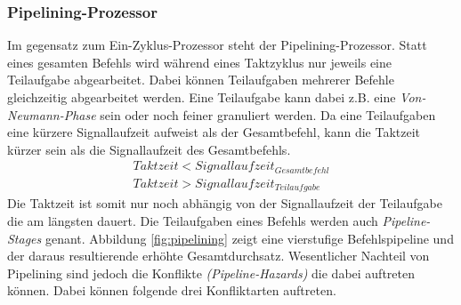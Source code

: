             \subsubsection{Pipelining-Prozessor}
                Im gegensatz zum Ein-Zyklus-Prozessor steht der Pipelining-Prozessor.
                Statt eines gesamten Befehls wird während eines Taktzyklus nur jeweils eine Teilaufgabe abgearbeitet.
                Dabei können Teilaufgaben mehrerer Befehle gleichzeitig abgearbeitet werden.
                Eine Teilaufgabe kann dabei z.B. eine \textit{Von-Neumann-Phase} sein oder noch feiner granuliert werden.
                Da eine Teilaufgaben eine kürzere Signallaufzeit aufweist als der Gesamtbefehl,
                kann die Taktzeit kürzer sein als die Signallaufzeit des Gesamtbefehls.
                \begin{equation}
                    \begin{split}
                        Taktzeit < Signallaufzeit_{Gesamtbefehl} \\
                        Taktzeit > Signallaufzeit_{Teilaufgabe}
                    \end{split}
                \end{equation}
                Die Taktzeit ist somit nur noch abhängig von der Signallaufzeit der Teilaufgabe die am längsten dauert.
                Die Teilaufgaben eines Befehls werden auch \textit{Pipeline-Stages} genant.
                Abbildung \ref{fig:pipelining} zeigt eine vierstufige Befehlspipeline und der daraus resultierende erhöhte Gesamtdurchsatz.
                Wesentlicher Nachteil von Pipelining sind jedoch die Konflikte \textit{(Pipeline-Hazards)}
                die dabei auftreten können. Dabei können folgende drei Konfliktarten auftreten.
    
